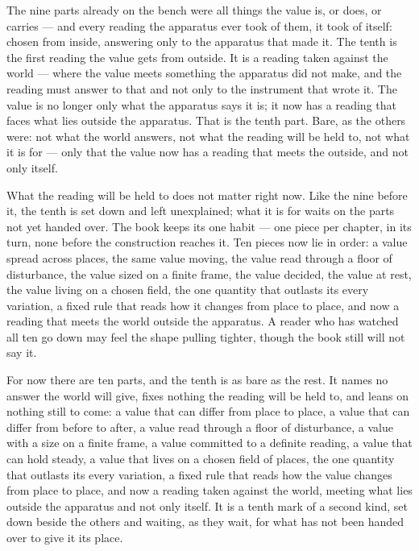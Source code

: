 The nine parts already on the bench were all things the value is, or does, or carries --- and every reading the apparatus ever took of them, it took of itself: chosen from inside, answering only to the apparatus that made it. The tenth is the first reading the value gets from outside. It is a reading taken against the world --- where the value meets something the apparatus did not make, and the reading must answer to that and not only to the instrument that wrote it. The value is no longer only what the apparatus says it is; it now has a reading that faces what lies outside the apparatus. That is the tenth part. Bare, as the others were: not what the world answers, not what the reading will be held to, not what it is for --- only that the value now has a reading that meets the outside, and not only itself.

What the reading will be held to does not matter right now. Like the nine before it, the tenth is set down and left unexplained; what it is for waits on the parts not yet handed over. The book keeps its one habit --- one piece per chapter, in its turn, none before the construction reaches it. Ten pieces now lie in order: a value spread across places, the same value moving, the value read through a floor of disturbance, the value sized on a finite frame, the value decided, the value at rest, the value living on a chosen field, the one quantity that outlasts its every variation, a fixed rule that reads how it changes from place to place, and now a reading that meets the world outside the apparatus. A reader who has watched all ten go down may feel the shape pulling tighter, though the book still will not say it.

For now there are ten parts, and the tenth is as bare as the rest. It names no answer the world will give, fixes nothing the reading will be held to, and leans on nothing still to come: a value that can differ from place to place, a value that can differ from before to after, a value read through a floor of disturbance, a value with a size on a finite frame, a value committed to a definite reading, a value that can hold steady, a value that lives on a chosen field of places, the one quantity that outlasts its every variation, a fixed rule that reads how the value changes from place to place, and now a reading taken against the world, meeting what lies outside the apparatus and not only itself. It is a tenth mark of a second kind, set down beside the others and waiting, as they wait, for what has not been handed over to give it its place.
